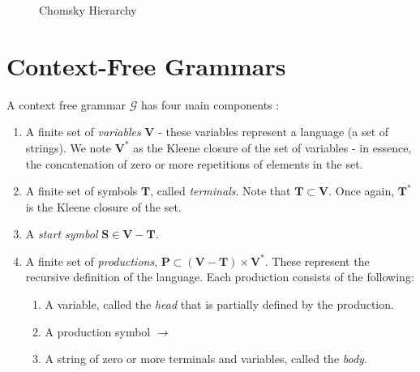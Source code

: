 \begin{figure}[h]
    \centering
    \caption{Chomsky Hierarchy}
    \label{fig:chomsky-fig}
\end{figure}

\section{Context-Free Grammars}

A context free grammar $\mathcal{G}$ has four main components \cite{hopcroft-automata}\cite{leeuwen-cfg}:
\begin{enumerate}
    \item A finite set of \emph{variables} $\mathbf{V}$ - these variables represent a language (a set of strings). We note $\mathbf{V}^*$ as the Kleene closure of the set of variables - in essence, the concatenation of zero or more repetitions of elements in the set.
    \item A finite set of symbols $\mathbf{T}$, called \emph{terminals}. Note that $\mathbf{T} \subset \mathbf{V}$. Once again, $\mathbf{T}^*$ is the Kleene closure of the set.
    \item A \emph{start symbol} $\mathbf{S} \in \mathbf{V}-\mathbf{T}$.
    \item A finite set of \emph{productions}, $\mathbf{P} \subset (\mathbf{V}-\mathbf{T})\times \mathbf{V}^*$. These represent the recursive definition of the language. Each production consists of the following:
    \begin{enumerate}
        \item A variable, called the \emph{head} that is partially defined by the production.
        \item A production symbol $\rightarrow$
        \item A string of zero or more terminals and variables, called the \emph{body}.
    \end{enumerate}
\end{enumerate}

